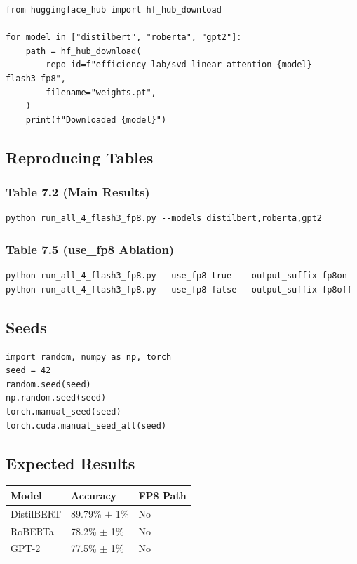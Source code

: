 \begin{lstlisting}
from huggingface_hub import hf_hub_download

for model in ["distilbert", "roberta", "gpt2"]:
    path = hf_hub_download(
        repo_id=f"efficiency-lab/svd-linear-attention-{model}-flash3_fp8",
        filename="weights.pt",
    )
    print(f"Downloaded {model}")
\end{lstlisting}

\subsection{Reproducing Tables}

\subsubsection{Table 7.2 (Main Results)}

\begin{lstlisting}
python run_all_4_flash3_fp8.py --models distilbert,roberta,gpt2
\end{lstlisting}

\subsubsection{Table 7.5 (use\_fp8 Ablation)}

\begin{lstlisting}
python run_all_4_flash3_fp8.py --use_fp8 true  --output_suffix fp8on
python run_all_4_flash3_fp8.py --use_fp8 false --output_suffix fp8off
\end{lstlisting}

\subsection{Seeds}

\begin{lstlisting}
import random, numpy as np, torch
seed = 42
random.seed(seed)
np.random.seed(seed)
torch.manual_seed(seed)
torch.cuda.manual_seed_all(seed)
\end{lstlisting}

\subsection{Expected Results}

\begin{table}[H]
\centering
\small
\begin{tabular}{lll}
\toprule
\textbf{Model} & \textbf{Accuracy} & \textbf{FP8 Path} \\
\midrule
DistilBERT & 89.79\% $\pm$ 1\% & No \\
RoBERTa & 78.2\% $\pm$ 1\% & No \\
GPT-2 & 77.5\% $\pm$ 1\% & No \\
\bottomrule
\end{tabular}
\end{table}

